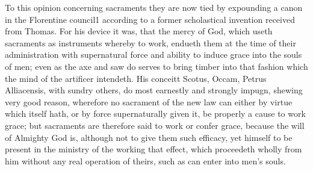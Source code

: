 To this opinion concerning sacraments they are now tied by expounding a canon in the Florentine council1 according to a former scholastical invention received from Thomas. For his device it was, that the mercy of God, which useth sacraments as instruments whereby to work, endueth them at the time of their administration with supernatural force and ability to induce grace into the souls of men; even as the axe and saw do serves to bring timber into that fashion which the mind of the artificer intendeth. His conceitt  Scotus, Occam, Petrus Alliacensis, with sundry others, do most earnestly and strongly impugn, shewing very good reason, wherefore no sacrament of the new law can either by virtue which itself hath, or by force supernaturally given it, be properly a cause to work grace; but sacraments are therefore said to work or confer grace, because the will of Almighty God is, although not to give them such efficacy, yet himself to be present in the ministry of the working that effect, which proceedeth wholly from him without any real operation of theirs, such as can enter into men’s souls.

